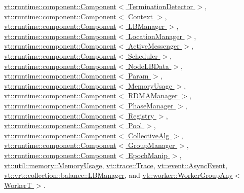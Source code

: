 \hyperlink{structvt_1_1runtime_1_1component_1_1_component_a7f07384d294e59796add9ce6be2d6410}{vt\+::runtime\+::component\+::\+Component$<$ Termination\+Detector $>$}, \hyperlink{structvt_1_1runtime_1_1component_1_1_component_a7f07384d294e59796add9ce6be2d6410}{vt\+::runtime\+::component\+::\+Component$<$ Context $>$}, \hyperlink{structvt_1_1runtime_1_1component_1_1_component_a7f07384d294e59796add9ce6be2d6410}{vt\+::runtime\+::component\+::\+Component$<$ L\+B\+Manager $>$}, \hyperlink{structvt_1_1runtime_1_1component_1_1_component_a7f07384d294e59796add9ce6be2d6410}{vt\+::runtime\+::component\+::\+Component$<$ Location\+Manager $>$}, \hyperlink{structvt_1_1runtime_1_1component_1_1_component_a7f07384d294e59796add9ce6be2d6410}{vt\+::runtime\+::component\+::\+Component$<$ Active\+Messenger $>$}, \hyperlink{structvt_1_1runtime_1_1component_1_1_component_a7f07384d294e59796add9ce6be2d6410}{vt\+::runtime\+::component\+::\+Component$<$ Scheduler $>$}, \hyperlink{structvt_1_1runtime_1_1component_1_1_component_a7f07384d294e59796add9ce6be2d6410}{vt\+::runtime\+::component\+::\+Component$<$ Node\+L\+B\+Data $>$}, \hyperlink{structvt_1_1runtime_1_1component_1_1_component_a7f07384d294e59796add9ce6be2d6410}{vt\+::runtime\+::component\+::\+Component$<$ Param $>$}, \hyperlink{structvt_1_1runtime_1_1component_1_1_component_a7f07384d294e59796add9ce6be2d6410}{vt\+::runtime\+::component\+::\+Component$<$ Memory\+Usage $>$}, \hyperlink{structvt_1_1runtime_1_1component_1_1_component_a7f07384d294e59796add9ce6be2d6410}{vt\+::runtime\+::component\+::\+Component$<$ R\+D\+M\+A\+Manager $>$}, \hyperlink{structvt_1_1runtime_1_1component_1_1_component_a7f07384d294e59796add9ce6be2d6410}{vt\+::runtime\+::component\+::\+Component$<$ Phase\+Manager $>$}, \hyperlink{structvt_1_1runtime_1_1component_1_1_component_a7f07384d294e59796add9ce6be2d6410}{vt\+::runtime\+::component\+::\+Component$<$ Registry $>$}, \hyperlink{structvt_1_1runtime_1_1component_1_1_component_a7f07384d294e59796add9ce6be2d6410}{vt\+::runtime\+::component\+::\+Component$<$ Pool $>$}, \hyperlink{structvt_1_1runtime_1_1component_1_1_component_a7f07384d294e59796add9ce6be2d6410}{vt\+::runtime\+::component\+::\+Component$<$ Collective\+Alg $>$}, \hyperlink{structvt_1_1runtime_1_1component_1_1_component_a7f07384d294e59796add9ce6be2d6410}{vt\+::runtime\+::component\+::\+Component$<$ Group\+Manager $>$}, \hyperlink{structvt_1_1runtime_1_1component_1_1_component_a7f07384d294e59796add9ce6be2d6410}{vt\+::runtime\+::component\+::\+Component$<$ Epoch\+Manip $>$}, \hyperlink{structvt_1_1util_1_1memory_1_1_memory_usage_add66c6cdabed24194310380c5a28951a}{vt\+::util\+::memory\+::\+Memory\+Usage}, \hyperlink{structvt_1_1trace_1_1_trace_a24019edd964c0a307008f8d6a0f1f825}{vt\+::trace\+::\+Trace}, \hyperlink{structvt_1_1event_1_1_async_event_ac8d9f977b1cca3f43a06d0e83bc88e3d}{vt\+::event\+::\+Async\+Event}, \hyperlink{structvt_1_1vrt_1_1collection_1_1balance_1_1_l_b_manager_a9b9c6fb3aef5efb81465cae39ce3bd06}{vt\+::vrt\+::collection\+::balance\+::\+L\+B\+Manager}, and \hyperlink{structvt_1_1worker_1_1_worker_group_any_ad8bb855b98bf26337ca13df2bff5fb95}{vt\+::worker\+::\+Worker\+Group\+Any$<$ Worker\+T $>$}.

